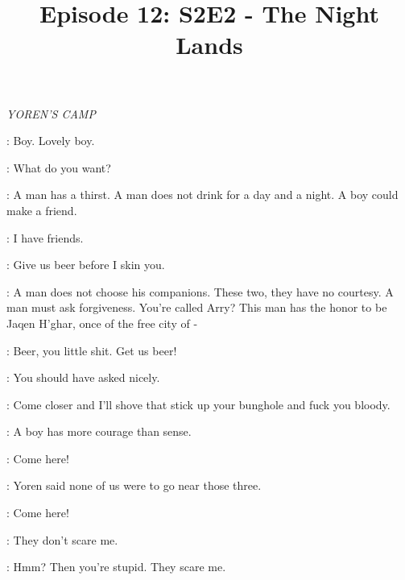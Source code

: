 

\title{Episode 12: S2E2 - The Night Lands}
\author{}
\date{}
\maketitle



\scene

\textit{YOREN'S CAMP}


\JAQEN: Boy. Lovely boy.

\ARYA: What do you want?

\JAQEN: A man has a thirst. A man does not drink for a day and a night. A boy could make a friend.

\ARYA: I have friends.

\RORGE: Give us beer before I skin you.

\JAQEN: A man does not choose his companions. These two, they have no courtesy. A man must ask forgiveness.  You're called Arry? This man has the honor to be Jaqen H'ghar, once of the free city of -

\RORGE: Beer, you little shit. Get us beer!

\ARYA: You should have asked nicely.


\RORGE: Come closer and I'll shove that stick up your bunghole and fuck you bloody.

\JAQEN: A boy has more courage than sense.

\RORGE: Come here!


\GENDRY: Yoren said none of us were to go near those three.

\RORGE: Come here!

\ARYA: They don't scare me.

\GENDRY: Hmm? Then you're stupid. They scare me.

